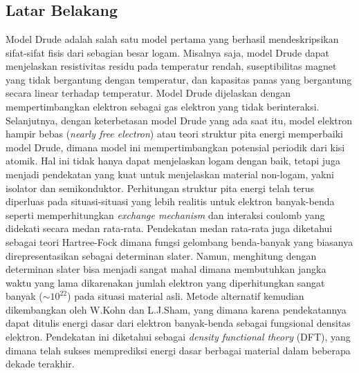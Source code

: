 \chapter{\babSatu}

\section{Latar Belakang}
Model Drude\cite{drude} adalah salah satu model pertama yang berhasil mendeskripsikan sifat-sifat fisis dari sebagian besar logam. Misalnya saja, model Drude dapat menjelaskan resistivitas residu pada temperatur rendah, suseptibilitas magnet yang tidak bergantung dengan temperatur, dan kapasitas panas yang bergantung  secara linear terhadap temperatur. Model Drude dijelaskan dengan mempertimbangkan elektron sebagai gas elektron yang tidak berinteraksi. Selanjutnya, dengan keterbetasan model Drude yang ada saat itu, model elektron hampir bebas (\textit{nearly free electron}) atau teori struktur pita energi\cite{ashcroft-mermin} memperbaiki model Drude, dimana model ini mempertimbangkan potensial periodik dari kisi atomik. Hal ini tidak hanya dapat menjelaskan logam dengan baik, tetapi juga menjadi pendekatan yang kuat untuk menjelaskan material non-logam, yakni isolator dan semikonduktor. Perhitungan struktur pita energi telah terus diperluas pada situasi-situasi yang lebih realitis untuk elektron banyak-benda seperti memperhitungkan \textit{exchange mechanism} dan interaksi coulomb yang didekati secara medan rata-rata. Pendekatan medan rata-rata juga diketahui sebagai teori Hartree-Fock dimana fungsi gelombang benda-banyak yang biasanya direpresentasikan sebagai determinan slater. Namun, menghitung dengan determinan slater bisa menjadi sangat mahal dimana membutuhkan jangka waktu yang lama dikarenakan jumlah elektron yang diperhitungkan sangat banyak ($\sim 10^{22}$) pada situasi material asli. Metode alternatif kemudian dikembangkan oleh W.Kohn dan L.J.Sham\cite{kohn-sham}, yang dimana karena pendekatannya dapat ditulis energi dasar dari elektron banyak-benda sebagai fungsional densitas elektron. Pendekatan ini diketahui sebagai \textit{density functional theory} (DFT), yang dimana telah sukses memprediksi energi dasar berbagai material dalam beberapa dekade terakhir.

